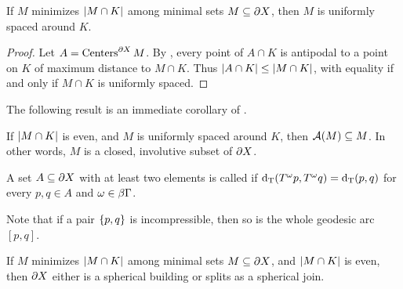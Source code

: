\documentclass{amsart}
\begin{document}
\begin{lemma}			\label{uniformly spaced}
If $M$ minimizes $\left| M \cap K \right|$ among minimal sets $M \subseteq \partial X$, then $M$ is uniformly spaced around $K$. \end{lemma}

\begin{proof}
Let $A = \operatorname{Centers}^{\partial X} M$.  By , every point of $A \cap K$ is antipodal to a point on $K$ of maximum distance to $M \cap K$.  Thus $\left| A \cap K \right| \le \left| M \cap K \right|$, with equality if and only if $M \cap K$ is uniformly spaced.
\end{proof}


The following result is an immediate corollary of .

\begin{lemma}		\label{even involutives}
If $\left| M \cap K \right|$ is even, and $M$ is uniformly spaced around $K$, then $\operatorname{\mathcal A}(M) \subseteq M$.  In other words, $M$ is a closed, involutive subset of $\partial X$. \end{lemma}

\begin{definition}
A set $A \subseteq \partial X$ with at least two elements is called  if $\operatorname{d_T}(T^{\omega} p, T^{\omega} q) = \operatorname{d_T}(p, q)$ for every $p,q \in A$ and $\omega \in \beta \Gamma$. \end{definition}

Note that if a pair $\left\{p,q\right\}$ is incompressible, then so is the whole geodesic arc $[p,q]$.

\begin{lemma}			\label{even case}
If $M$ minimizes $\left| M \cap K \right|$ among minimal sets $M \subseteq \partial X$, and $\left| M \cap K \right|$ is even, then $\partial X$ either is a spherical building or splits as a spherical join. \end{lemma}
\end{document}
